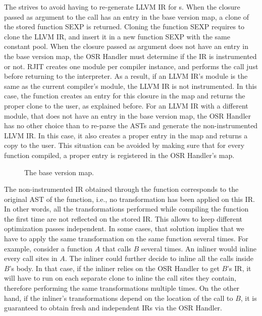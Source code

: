 The  strives to avoid having to re-generate LLVM IR for s.
When the closure passed as argument to the  call has an entry in the base version map, a clone of the stored function SEXP is returned.
Cloning the function SEXP requires to clone the LLVM IR, and insert it in a new function SEXP with the same constant pool.
When the closure passed as argument does not have an entry in the base version map, the OSR Handler must determine if the IR is instrumented or not.
RJIT creates one module per compiler instance, and performs the  call just before returning to the interpreter.
As a result, if an LLVM IR's module is the same as the current compiler's module, the LLVM IR is not instrumented.
In this case, the  function creates an entry for this closure in the  map and returns the proper clone to the user, as explained before.
For an LLVM IR with a different module, that does not have an entry in the base version map, the OSR Handler has no other choice than to re-parse the ASTs and generate the non-instrumented LLVM IR.
In this case, it also creates a proper entry in the  map and returns a copy to the user.
This situation can be avoided by making sure that for every function compiled, a proper entry is registered in the OSR Handler's  map.\\

\begin{figure}[h]
\caption{The base version map.}
\label{fig:baseversionmap}
\end{figure}

The non-instrumented IR obtained through the  function corresponds to the original AST of the function, i.e., no transformation has been applied on this IR. 
In other words, all the transformations performed while compiling the function the first time are not reflected on the stored IR. 
This allows to keep different optimization passes independent.
In some cases, that solution implies that we have to apply the same transformation on the same function several times.
For example, consider a function $A$ that calls $B$ several times.
An inliner would inline every call sites in $A$.
The inliner could further decide to inline all the calls inside $B$'s body.
In that case, if the inliner relies on the OSR Handler to get $B$'s IR, it will have to run on each separate clone to inline the call sites they contain, therefore performing the same transformations multiple times.
On the other hand, if the inliner's transformations depend on the location of the call to $B$, it is guaranteed to obtain fresh and independent IRs via the OSR Handler.\\

